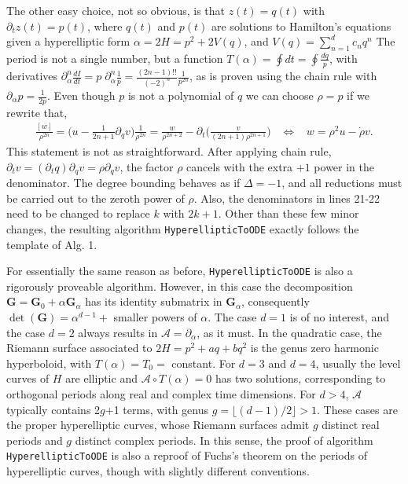 \documentclass[nofootinbib,preprint]{revtex4-1}
\begin{document}
The other easy choice, not so obvious, is that $z(t)=q(t)$ with $\partial_t z(t)=p(t)$,
where $q(t)$ and $p(t)$ are solutions to Hamilton's equations given a hyperelliptic
form $\alpha=2H=p^2+2V(q)$, and $V(q)=\sum_{n=1}^{d}c_n q^n$ The period is not a single 
number, but a function $T(\alpha)=\oint dt = \oint \frac{dq}{p}$, with derivatives 
$\partial_{\alpha}^n\frac{dI}{dt} = p \;\partial_{\alpha}^n \frac{1}{p}= \frac{(2n-1)!!}{(-2)^n}\frac{1}{p^{2n}}$,
as is proven using the chain rule with $\partial_{\alpha}p=\frac{1}{2p}$. Even though 
$p$ is not a polynomial of $q$ we can choose $\rho=p$ if we rewrite that,
\begin{eqnarray}
\frac{[w]}{\rho^{2n}}=\Big(u-\frac{1}{2n+1}\partial_q v\Big)\frac{1}{\rho^{2n}} = 
\frac{w}{\rho^{2n+2}}-\partial_t\bigg( \frac{v}{(2n+1)\rho^{2n+1}}\bigg) 
\;\;\; \iff \;\;\; 
 w = \rho^2 u -\dot{\rho} v \nonumber.
\end{eqnarray}
This statement is not as straightforward. After applying chain rule,
${\partial_t v = (\partial_t q) \partial_q v= \rho \partial_q v}$, the factor $\rho$ 
cancels with the extra $+1$ power in the denominator. The degree bounding behaves 
as if $\Delta=-1$, and all reductions must be carried out to the zeroth power 
of $\rho$. Also, the denominators in lines 21-22 need to be changed to replace 
$k$ with $2k+1$. Other than these few minor changes, the resulting algorithm
\texttt{HyperellipticToODE} exactly follows the template of Alg. 1.
 
For essentially the same reason as before, \texttt{HyperellipticToODE} is also a
rigorously proveable algorithm. However, in this case the decomposition 
$\mathbf{G}=\mathbf{G}_0+\alpha \mathbf{G}_{\alpha}$ has its identity submatrix
in $\mathbf{G}_{\alpha}$, consequently $\det(\mathbf{G})=\alpha^{d-1}+$
smaller powers of $\alpha$. The case $d=1$ is of no interest, and the case $d=2$
always results in $\mathcal{A} = \partial_{\alpha}$, as it must. In the quadratic
case, the Riemann surface associated to $2H=p^2+a q+b q^2$ is the genus zero 
harmonic hyperboloid, with $T(\alpha)=T_0=$ constant. For $d=3$ and $d=4$, usually
the level curves of $H$ are elliptic and $\mathcal{A}\circ T(\alpha)=0$ has 
two solutions, corresponding to orthogonal periods along real and complex time 
dimensions. For $d>4$, $\mathcal{A}$ typically contains 2$g$+1 terms, with 
genus $g=\lfloor (d-1)/2 \rfloor>1$. These cases are the proper hyperelliptic 
curves, whose Riemann surfaces admit $g$ distinct real periods and 
$g$ distinct complex periods. In this sense, the proof of algorithm 
\texttt{HyperellipticToODE} is also a reproof of Fuchs's theorem on the 
periods of hyperelliptic curves\cite{GRAY2010}, 
though with slightly different conventions.
\end{document}
